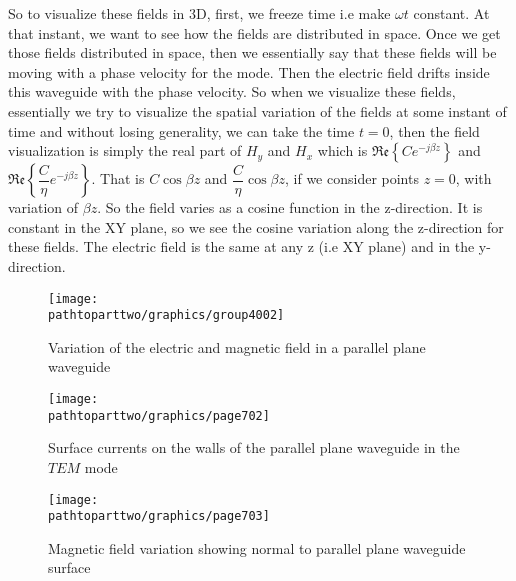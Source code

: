 So to visualize these fields in 3D, first, we freeze time i.e make ${\omega t}$ constant. At that instant, we want to see how the fields are distributed in space. Once we get those fields distributed in space, then we essentially say that these fields will be moving with a phase velocity for the mode. Then the electric field drifts inside this waveguide with the phase velocity. So when we visualize these fields, essentially we try to visualize the spatial variation of the fields at some instant of time and without losing generality, we can take the time $t=0$, then the field visualization is simply the real part of ${H_y}$ and ${H_x}$ which is ${\mathfrak{Re}\left\{Ce^{-j\beta z}\right\}}$ and ${\mathfrak{Re}\left\{\dfrac{C}{\eta}e^{-j\beta z}\right\}}$. That is ${C\cos\beta z}$ and ${\dfrac{C}{\eta}\cos\beta z}$, if we consider points $z=0$, with variation of ${\beta z}$. So the field varies as a cosine function in the z-direction. It is constant in the XY plane, so we see the cosine variation along the z-direction for these fields. The electric field is the same at any z (i.e XY plane) and in the y-direction.
\begin{figure}[h]
\centering
\texttt{[image: \\pathtoparttwo/graphics/group4002]}
\caption{Variation of the electric and magnetic field in a parallel plane waveguide}
\label{fig:group4002}
\end{figure}
\begin{figure}[h]
\centering
\texttt{[image: \\pathtoparttwo/graphics/page702]}
\caption{Surface currents on the walls of the parallel plane waveguide in the $TEM$ mode}
\label{fig:page702}
\end{figure}
\begin{figure}[h]
\centering
\texttt{[image: \\pathtoparttwo/graphics/page703]}
\caption{Magnetic field variation showing normal to parallel plane waveguide surface}
\label{fig:page703}
\end{figure}

